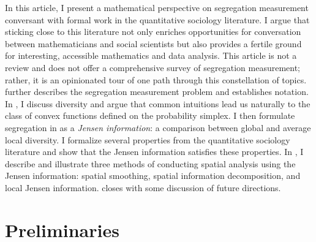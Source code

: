 In this article, I present a mathematical perspective on segregation measurement conversant with formal work in the quantitative sociology literature. 
I argue that sticking close to this literature not only enriches opportunities for conversation between mathematicians and social scientists but also provides a fertile ground for interesting, accessible mathematics and data analysis.
This article is not a review and does not offer a comprehensive survey of segregation measurement; rather, it is an opinionated tour of one path through this constellation of topics. 
 further describes the segregation measurement problem and establishes notation. 
In , I discuss diversity and argue that common intuitions lead us naturally to the class of convex functions defined on the probability simplex.
I then formulate segregation in  as a \emph{Jensen information}: a comparison between global and average local diversity. 
I formalize several properties from the quantitative sociology literature and show that the Jensen information satisfies these properties.
In , I describe and illustrate three methods of conducting spatial analysis using the Jensen information: spatial smoothing, spatial information decomposition, and local Jensen information. 
 closes with some discussion of future directions.   

\section{Preliminaries} \label{sec:preliminaries}

